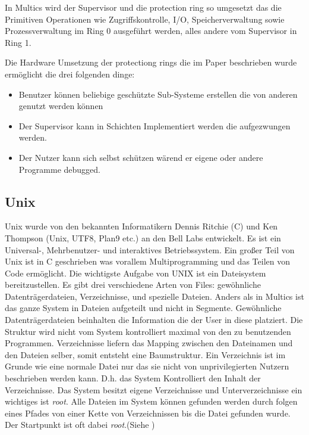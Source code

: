 \documentclass[9pt,technote]{IEEEtran}
\begin{document}
    
    In Multics wird der Supervisor und die protection ring so umgesetzt das die Primitiven Operationen wie Zugriffskontrolle, I/O, Speicherverwaltung sowie
    Prozessverwaltung im Ring 0 ausgef\"uhrt werden, alles andere vom Supervisor in Ring 1.
    
    Die Hardware Umsetzung der protectiong rings die im Paper \cite{inproc:protec-rings} beschrieben wurde erm\"oglicht die drei folgenden dinge:
    \begin{itemize}
      \item Benutzer k\"onnen beliebige gesch\"utzte Sub-Systeme erstellen die von anderen genutzt werden k\"onnen
      \item Der Supervisor kann in Schichten Implementiert werden die aufgezwungen werden.
      \item Der Nutzer kann sich selbst sch\"utzen w\"arend er eigene oder andere Programme debugged.
    \end{itemize}
    
    
  \subsection{Unix}
    Unix wurde von den bekannten Informatikern Dennis Ritchie (C) und Ken Thompson (Unix, UTF8, Plan9 etc.) an den Bell Labs entwickelt.
    Es ist ein Universal-, Mehrbenutzer- und interaktives Betriebssystem. Ein gro\ss er Teil von Unix ist in C geschrieben was vorallem Multiprogramming
    und das Teilen von Code erm\"oglicht. Die wichtigste Aufgabe von UNIX ist ein Dateisystem bereitzustellen. Es gibt drei verschiedene Arten von Files:
    gew\"ohnliche Datentr\"agerdateien, Verzeichnisse, und spezielle Dateien. Anders als in Multics ist das ganze System in Dateien aufgeteilt und nicht in
    Segmente. Gew\"ohnliche Datentr\"agerdateien beinhalten die Information die der User in diese platziert. Die Struktur wird nicht vom System kontrolliert maximal
    von den zu benutzenden Programmen. Verzeichnisse liefern das Mapping zwischen den Dateinamen und den Dateien selber, somit entsteht eine Baumstruktur.
    Ein Verzeichnis ist im Grunde wie eine normale Datei nur das sie nicht von unprivilegierten Nutzern beschrieben werden kann. D.h. das System Kontrolliert den
    Inhalt der Verzeichnisse. Das System besitzt eigene Verzeichnisse und Unterverzeichnisse ein wichtiges ist \textit{root}. Alle Dateien im System k\"onnen gefunden 
    werden durch folgen eines Pfades von einer Kette von Verzeichnissen bis die Datei gefunden wurde. Der Startpunkt ist oft dabei \textit{root}.(Siehe \cite[S. 366]{inproc:unix})
    
\end{document}
